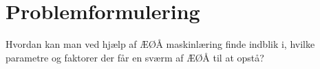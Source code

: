 \chapter{Problemformulering}\label{ch:problemformulering}

Hvordan kan man ved hjælp af ÆØÅ maskinlæring finde indblik i, hvilke parametre og faktorer der får en sværm af ÆØÅ til at opstå?